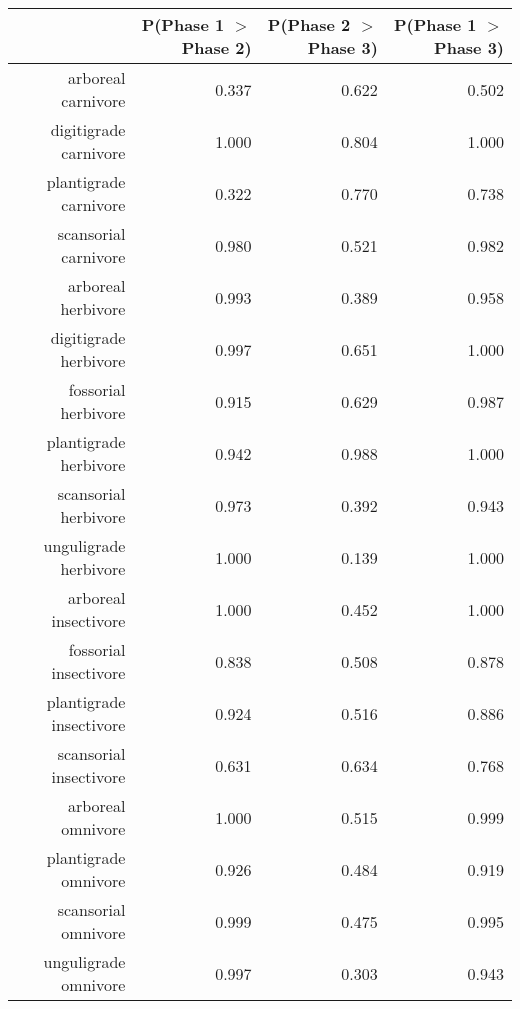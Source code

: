 \begin{table}[ht]
\centering
\begin{tabular}{rrrr}
  \hline
 & P(Phase 1 $>$ Phase 2) & P(Phase 2 $>$ Phase 3) & P(Phase 1 $>$ Phase 3) \\ 
  \hline
arboreal carnivore & 0.337 & 0.622 & 0.502 \\ 
  digitigrade carnivore & 1.000 & 0.804 & 1.000 \\ 
  plantigrade carnivore & 0.322 & 0.770 & 0.738 \\ 
  scansorial carnivore & 0.980 & 0.521 & 0.982 \\ 
  arboreal herbivore & 0.993 & 0.389 & 0.958 \\ 
  digitigrade herbivore & 0.997 & 0.651 & 1.000 \\ 
  fossorial herbivore & 0.915 & 0.629 & 0.987 \\ 
  plantigrade herbivore & 0.942 & 0.988 & 1.000 \\ 
  scansorial herbivore & 0.973 & 0.392 & 0.943 \\ 
  unguligrade herbivore & 1.000 & 0.139 & 1.000 \\ 
  arboreal insectivore & 1.000 & 0.452 & 1.000 \\ 
  fossorial insectivore & 0.838 & 0.508 & 0.878 \\ 
  plantigrade insectivore & 0.924 & 0.516 & 0.886 \\ 
  scansorial insectivore & 0.631 & 0.634 & 0.768 \\ 
  arboreal omnivore & 1.000 & 0.515 & 0.999 \\ 
  plantigrade omnivore & 0.926 & 0.484 & 0.919 \\ 
  scansorial omnivore & 0.999 & 0.475 & 0.995 \\ 
  unguligrade omnivore & 0.997 & 0.303 & 0.943 \\ 
   \hline
\end{tabular}
\label{tab:origin_plant}
\end{table}
